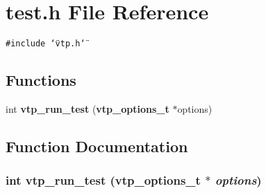 \section{test.h File Reference}
\label{test_8h}
{\tt \#include \char`\"{}vtp.h\char`\"{}}\par
\subsection*{Functions}
\begin{CompactItemize}
\item 
int {\bf vtp\_\-run\_\-test} ({\bf vtp\_\-options\_\-t} $\ast$options)
\end{CompactItemize}


\subsection{Function Documentation}
\subsubsection{\setlength{\rightskip}{0pt plus 5cm}int vtp\_\-run\_\-test ({\bf vtp\_\-options\_\-t} $\ast$ {\em options})}\label{test_8h_a0}


